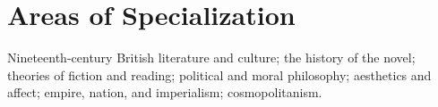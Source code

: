 \documentclass[10pt,letterpaper]{article}
\renewenvironment{itemize}{
  \begin{list}{}{
    \setlength{\leftmargin}{1.5em}
    \setlength{\itemsep}{0.25em}
    \setlength{\parskip}{0pt}
    \setlength{\parsep}{0.25em}
  }
}{
  \end{list}
}
\begin{document}
\section*{Areas of Specialization}

\begin{itemize}
\item Nineteenth-century British literature and culture; the history of the novel; theories of fiction and reading; political and moral philosophy; aesthetics and affect; empire, nation, and imperialism; cosmopolitanism.
\end{itemize}



% 

\end{document}
